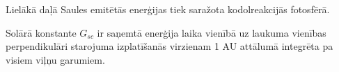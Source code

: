 
Lielākā daļā Saules emitētās enerģijas tiek saražota kodolreakcijās fotosfērā.

Solārā konstante $G_{sc}$ ir saņemtā enerģija laika vienībā uz laukuma vienības perpendikulāri starojuma izplatīšanās virzienam 1 AU attālumā integrēta pa visiem viļņu garumiem.\cite{ThermalProcesses}

